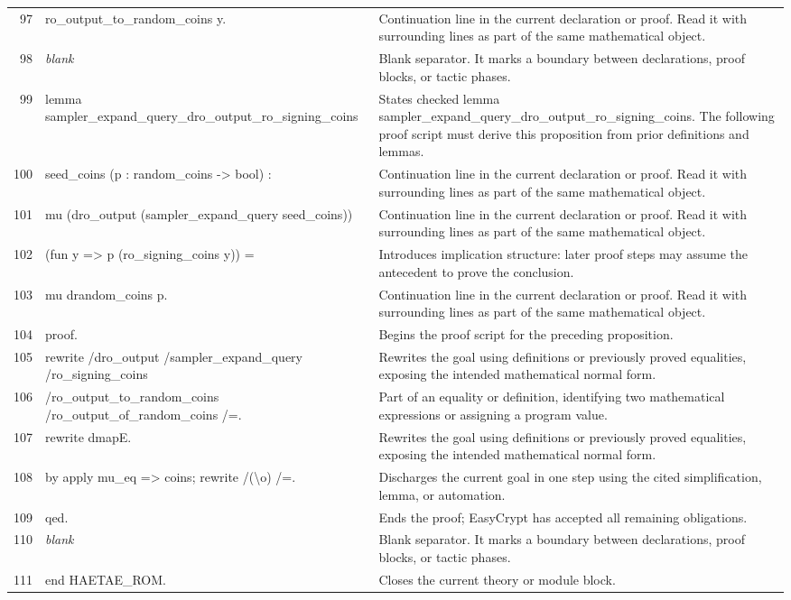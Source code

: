 \documentclass[10pt]{article}
\begin{document}
\begin{longtable}{r L{0.53\textwidth} L{0.37\textwidth}}
97 & {\ttfamily\scriptsize   ro\_output\_to\_random\_coins y.} & Continuation line in the current declaration or proof.  Read it with surrounding lines as part of the same mathematical object. \\
98 & {\ttfamily\scriptsize \emph{blank}} & Blank separator.  It marks a boundary between declarations, proof blocks, or tactic phases. \\
99 & {\ttfamily\scriptsize lemma sampler\_expand\_query\_dro\_output\_ro\_signing\_coins} & States checked lemma sampler\_expand\_query\_dro\_output\_ro\_signing\_coins.  The following proof script must derive this proposition from prior definitions and lemmas. \\
100 & {\ttfamily\scriptsize     seed\_coins (p : random\_coins -> bool) :} & Continuation line in the current declaration or proof.  Read it with surrounding lines as part of the same mathematical object. \\
101 & {\ttfamily\scriptsize   mu (dro\_output (sampler\_expand\_query seed\_coins))} & Continuation line in the current declaration or proof.  Read it with surrounding lines as part of the same mathematical object. \\
102 & {\ttfamily\scriptsize      (fun y => p (ro\_signing\_coins y)) =} & Introduces implication structure: later proof steps may assume the antecedent to prove the conclusion. \\
103 & {\ttfamily\scriptsize   mu drandom\_coins p.} & Continuation line in the current declaration or proof.  Read it with surrounding lines as part of the same mathematical object. \\
104 & {\ttfamily\scriptsize proof.} & Begins the proof script for the preceding proposition. \\
105 & {\ttfamily\scriptsize rewrite /dro\_output /sampler\_expand\_query /ro\_signing\_coins} & Rewrites the goal using definitions or previously proved equalities, exposing the intended mathematical normal form. \\
106 & {\ttfamily\scriptsize         /ro\_output\_to\_random\_coins /ro\_output\_of\_random\_coins /=.} & Part of an equality or definition, identifying two mathematical expressions or assigning a program value. \\
107 & {\ttfamily\scriptsize rewrite dmapE.} & Rewrites the goal using definitions or previously proved equalities, exposing the intended mathematical normal form. \\
108 & {\ttfamily\scriptsize by apply mu\_eq => coins; rewrite /(\textbackslash{}o) /=.} & Discharges the current goal in one step using the cited simplification, lemma, or automation. \\
109 & {\ttfamily\scriptsize qed.} & Ends the proof; EasyCrypt has accepted all remaining obligations. \\
110 & {\ttfamily\scriptsize \emph{blank}} & Blank separator.  It marks a boundary between declarations, proof blocks, or tactic phases. \\
111 & {\ttfamily\scriptsize end HAETAE\_ROM.} & Closes the current theory or module block. \\
\bottomrule
\end{longtable}
\end{document}
